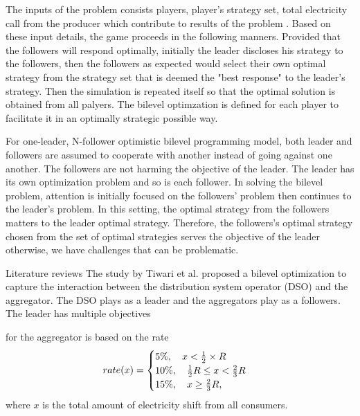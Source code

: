 \documentclass{article}
\begin{document}
The inputs of the problem consists players, player's strategy set, total electricity call from the producer which contribute to results of the problem \cite{yu2016}.
Based on these input details, the game proceeds in the following manners. 
Provided that the followers will respond optimally, initially the leader discloses his strategy to the followers, then the followers as expected would select their own optimal strategy from the strategy set that is deemed the "best response" to the leader's strategy.
Then the simulation is repeated itself so that the optimal solution is obtained from all palyers.
The bilevel optimzation is defined for each player to facilitate it in an optimally strategic possible way.

For one-leader, N-follower optimistic bilevel programming model, both leader and followers are assumed to cooperate with another instead of going against one another.
The followers are not harming the objective of the leader.
The leader has its own optimization problem and so is each follower.
In solving the bilevel problem, attention is initially focused on the followers' problem then continues to the leader's problem.
In this setting, the optimal strategy from the followers matters to the leader optimal strategy.
Therefore, the followers's optimal strategy chosen from the set of optimal strategies serves the objective of the leader otherwise, we have challenges that can be problematic.


{\red Literature reviews} The study by Tiwari et al. \cite{TIWARI2025101671} proposed a bilevel optimization to capture the interaction between the distribution system operator (DSO) and the aggregator.
The DSO plays as a leader and the aggregators play as a followers.
The leader has multiple objectives


\cite{sinha2018review}







\newpage



\begin{optim}
\end{optim}


\newpage

\vspace{0.4cm}

 for the aggregator is based on the rate
\begin{equation}
  rate(x) = 
  \begin{cases}
    5\%, \quad x < \frac12 \times R \\
    10 \%, \quad \frac12 R \le x < \frac23 R \\
    15 \%, \quad x \ge \frac23 R,
  \end{cases}
\end{equation}
where $x$ is the total amount of electricity shift from all consumers.
\end{document}
